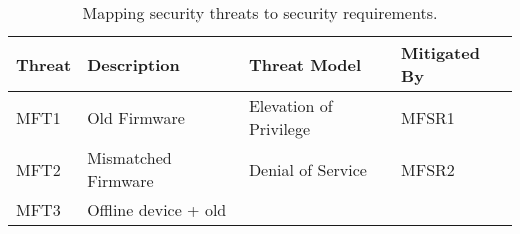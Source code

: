 \documentclass[0-thesis.tex]{subfiles}
\begin{document}
\begin{longtable}[]{@{}llll@{}}
    \caption{Mapping security threats to security requirements.}
    \label{tab:threats-to-requirements}\\
    \toprule
    \begin{minipage}[b]{0.08\columnwidth}\raggedright\strut Threat\strut \end{minipage} &
    \begin{minipage}[b]{0.44\columnwidth}\raggedright\strut Description\strut
    \end{minipage} & \begin{minipage}[b]{0.30\columnwidth}\raggedright\strut Threat
    Model\strut \end{minipage} & \begin{minipage}[b]{0.20\columnwidth}\raggedright\strut
    Mitigated By\strut \end{minipage}\tabularnewline
    \midrule
    \endhead
    \begin{minipage}[t]{0.05\columnwidth}\raggedright\strut MFT1\strut \end{minipage} &
    \begin{minipage}[t]{0.44\columnwidth}\raggedright\strut Old Firmware\strut
    \end{minipage} & \begin{minipage}[t]{0.30\columnwidth}\raggedright\strut Elevation of
    Privilege\strut \end{minipage} &
    \begin{minipage}[t]{0.09\columnwidth}\raggedright\strut MFSR1\strut
    \end{minipage}\tabularnewline
    \begin{minipage}[t]{0.05\columnwidth}\raggedright\strut MFT2\strut \end{minipage} &
    \begin{minipage}[t]{0.44\columnwidth}\raggedright\strut Mismatched Firmware\strut
    \end{minipage} & \begin{minipage}[t]{0.30\columnwidth}\raggedright\strut Denial of
    Service\strut \end{minipage} & \begin{minipage}[t]{0.09\columnwidth}\raggedright\strut
    MFSR2\strut \end{minipage}\tabularnewline
    \begin{minipage}[t]{0.05\columnwidth}\raggedright\strut MFT3\strut \end{minipage} &
    \begin{minipage}[t]{0.44\columnwidth}\raggedright\strut Offline device + old

\end{minipage}
\end{longtable}
\end{document}
